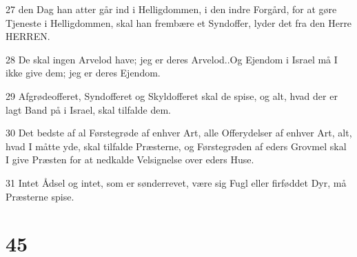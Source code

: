 \par 27 den Dag han atter går ind i Helligdommen, i den indre Forgård, for at gøre Tjeneste i Helligdommen, skal han frembære et Syndoffer, lyder det fra den Herre HERREN.
\par 28 De skal ingen Arvelod have; jeg er deres Arvelod..Og Ejendom i Israel må I ikke give dem; jeg er deres Ejendom.
\par 29 Afgrødeofferet, Syndofferet og Skyldofferet skal de spise, og alt, hvad der er lagt Band på i Israel, skal tilfalde dem.
\par 30 Det bedste af al Førstegrøde af enhver Art, alle Offerydelser af enhver Art, alt, hvad I måtte yde, skal tilfalde Præsterne, og Førstegrøden af eders Grovmel skal I give Præsten for at nedkalde Velsignelse over eders Huse.
\par 31 Intet Ådsel og intet, som er sønderrevet, være sig Fugl eller firføddet Dyr, må Præsterne spise.

\chapter{45}

